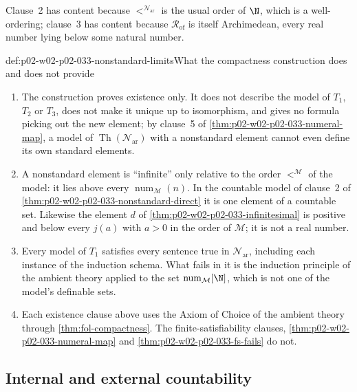 Clause~2 has content because \(<^{\mathcal N_{\mathrm{ar}}}\) is the usual
order of \(\N\), which is a well-ordering; clause~3 has content because
\(\mathcal R_{\mathrm{of}}\) is itself Archimedean, every real number lying
below some natural number.

\begin{hbwarning}{def:p02-w02-p02-033-nonstandard-limits}{What the compactness construction does and does not provide}
\begin{enumerate}
  \item The construction proves existence only.  It does not describe the
        model of \(T_1\), \(T_2\) or \(T_3\), does not make it unique up to
        isomorphism, and gives no formula picking out the new element; by
        clause~5 of \cref{thm:p02-w02-p02-033-numeral-map}, a model of
        \(\operatorname{Th}(\mathcal N_{\mathrm{ar}})\) with a nonstandard
        element cannot even define its own standard elements.
  \item A nonstandard element is ``infinite'' only relative to the order
        \(<^{\mathcal M}\) of the model: it lies above every
        \(\operatorname{num}_{\mathcal M}(n)\).  In the countable model of
        clause~2 of \cref{thm:p02-w02-p02-033-nonstandard-direct} it is one
        element of a countable set.  Likewise the element \(d\) of
        \cref{thm:p02-w02-p02-033-infinitesimal} is positive and below every
        \(j(a)\) with \(a>0\) in the order of \(\mathcal M\); it is not a real
        number.
  \item Every model of \(T_1\) satisfies every sentence true in
        \(\mathcal N_{\mathrm{ar}}\), including each instance of the induction
        schema.  What fails in it is the induction principle of the ambient
        theory applied to the set \(\operatorname{num}_{\mathcal M}[\N]\),
        which is not one of the model's definable sets.
  \item Each existence clause above uses the Axiom of Choice of the ambient
        theory through \cref{thm:fol-compactness}.  The
        finite-satisfiability clauses,
        \cref{thm:p02-w02-p02-033-numeral-map} and
        \cref{thm:p02-w02-p02-033-fs-fails} do not.
\end{enumerate}
\end{hbwarning}

\subsection{Internal and external countability}
\label{sec:p02-w02-p02-033-skolem}

